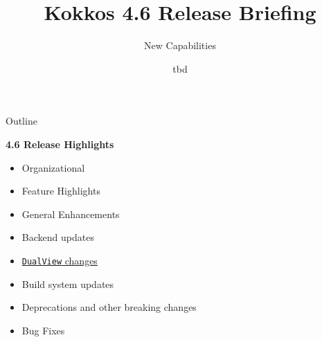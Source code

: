 
\usepackage{tikz}
\graphicspath{{4_6/figures/}}

\def\sandid{SANDXXXX PE}

\title{Kokkos 4.6 Release Briefing}

\author{New Capabilities}

\date{tbd}



\shorttrue
\mediumfalse
\fullfalse



\begin{frame}
  \titlepage
\end{frame}


\begin{frame}[fragile]{Outline}

  \textbf{4.6 Release Highlights}

  \begin{itemize}
    \item{Organizational}
    \item{Feature Highlights}
    \item{General Enhancements}
    \item{Backend updates}
    \item{\hyperlink{sec:dualview}{\texttt{DualView} changes}}
    \item{Build system updates}
    \item{Deprecations and other breaking changes}
    \item{Bug Fixes}
  \end{itemize}

\end{frame}

